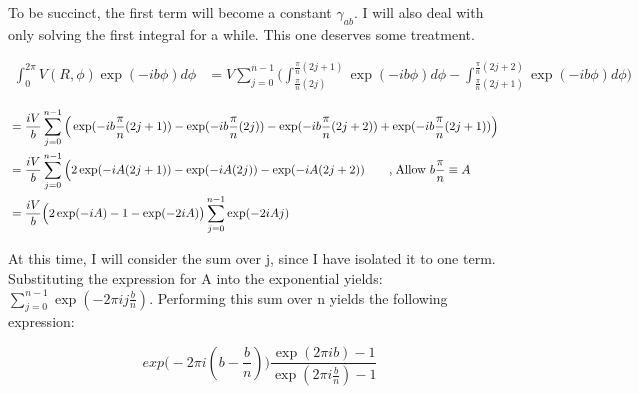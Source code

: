 \begin{homeworkProblem}[Jackson 3rd ed. : 3.4a]
To be succinct, the first term will become a constant $\gamma_{ab}$. I will also deal with only solving the first integral for a while. This one deserves some treatment.

\begin{align}
  \int_0^{2\pi} V(R,\phi) \exp(-i b\phi) d\phi &= V\sum_{j=0}^{n-1} \Big( \int_{\frac{\pi}{n}(2j)}^{\frac{\pi}{n}(2j+1)} \exp(-i b\phi) d\phi - \int_{\frac{\pi}{n}(2j+1)}^{\frac{\pi}{n}(2j+2)} \exp(-i b\phi) d\phi \Big) \nonumber
\end{align}

\begin{align}
	&= \frac{iV}{b} \sum\limits_{j=0}^{n-1} \Big( \exp(-ib\frac{\pi}{n}(2j+1)) - \exp(-ib \frac{\pi}{n}(2j)) - \exp(-ib \frac{\pi}{n}(2j+2)) + \exp(-ib \frac{\pi}{n}(2j+1)) \Big) \quad \nonumber \\
	&= \frac{iV}{b} \sum\limits_{j=0}^{n-1} \Big(2\exp(-iA(2j+1)) - \exp(-iA(2j)) -\exp(-iA(2j+2)) \quad\quad \text{,\;Allow $b \frac{\pi}{n} \equiv A$} \nonumber \\
	&= \frac{iV}{b} \Big(2\exp(-iA)-1-\exp(-2iA)\big) \sum\limits_{j=0}^{n-1} \exp(-2iAj) 
\end{align}

At this time, I will consider the sum over j, since I have isolated it to one term. Substituting the expression for A into the exponential yields: $\sum\limits_{j=0}^{n-1} \exp(-2\pi i j \frac{b}{n})$. Performing this sum over n yields the following expression:

\[
exp\big(-2\pi i (b-\frac{b}{n})\big) \frac{\exp(2\pi i b)-1}{\exp(2\pi i \frac{b}{n})-1} \nonumber
\]


\end{homeworkProblem}
